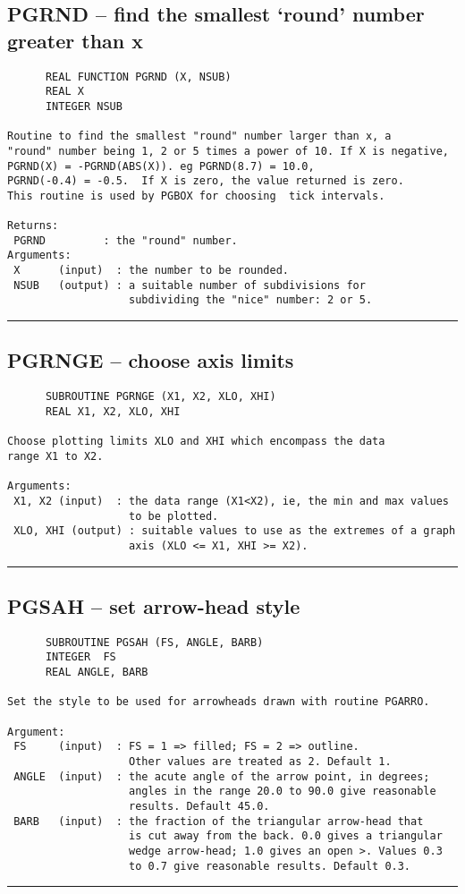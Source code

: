 {\subsection*{PGRND -- find the smallest `round' number greater than x }
\begin{verbatim}
      REAL FUNCTION PGRND (X, NSUB)
      REAL X
      INTEGER NSUB

Routine to find the smallest "round" number larger than x, a
"round" number being 1, 2 or 5 times a power of 10. If X is negative,
PGRND(X) = -PGRND(ABS(X)). eg PGRND(8.7) = 10.0,
PGRND(-0.4) = -0.5.  If X is zero, the value returned is zero.
This routine is used by PGBOX for choosing  tick intervals.

Returns:
 PGRND         : the "round" number.
Arguments:
 X      (input)  : the number to be rounded.
 NSUB   (output) : a suitable number of subdivisions for
                   subdividing the "nice" number: 2 or 5.
\end{verbatim}
\hrule


\subsection*{PGRNGE -- choose axis limits }
\begin{verbatim}
      SUBROUTINE PGRNGE (X1, X2, XLO, XHI)
      REAL X1, X2, XLO, XHI

Choose plotting limits XLO and XHI which encompass the data
range X1 to X2.

Arguments:
 X1, X2 (input)  : the data range (X1<X2), ie, the min and max values
                   to be plotted.
 XLO, XHI (output) : suitable values to use as the extremes of a graph
                   axis (XLO <= X1, XHI >= X2).
\end{verbatim}
\hrule


\subsection*{PGSAH -- set arrow-head style }
\begin{verbatim}
      SUBROUTINE PGSAH (FS, ANGLE, BARB)
      INTEGER  FS
      REAL ANGLE, BARB

Set the style to be used for arrowheads drawn with routine PGARRO.

Argument:
 FS     (input)  : FS = 1 => filled; FS = 2 => outline.
                   Other values are treated as 2. Default 1.
 ANGLE  (input)  : the acute angle of the arrow point, in degrees;
                   angles in the range 20.0 to 90.0 give reasonable
                   results. Default 45.0.
 BARB   (input)  : the fraction of the triangular arrow-head that
                   is cut away from the back. 0.0 gives a triangular
                   wedge arrow-head; 1.0 gives an open >. Values 0.3
                   to 0.7 give reasonable results. Default 0.3.
\end{verbatim}
\hrule


}
